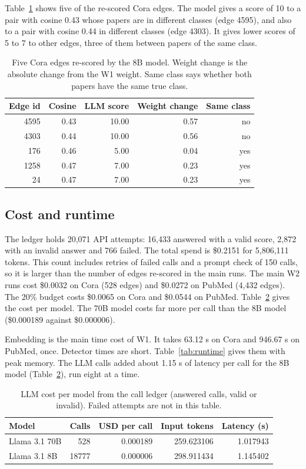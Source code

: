 Table~\ref{tab:case} shows five of the re-scored Cora edges. The model gives a score of 10 to a pair with cosine 0.43 whose papers are in different classes (edge 4595), and also to a pair with cosine 0.44 in different classes (edge 4303). It gives lower scores of 5 to 7 to other edges, three of them between papers of the same class.

\begin{table}[!t]
\centering
\caption{Five Cora edges re-scored by the 8B model. Weight change is the absolute change from the W1 weight. Same class says whether both papers have the same true class.}
\label{tab:case}
\footnotesize
\begin{tabular}{@{}rrrrr@{}}
\toprule
Edge id & Cosine & LLM score & Weight change & Same class \\
\midrule
4595 & 0.43 & 10.00 & 0.57 & no \\
4303 & 0.44 & 10.00 & 0.56 & no \\
176 & 0.46 & 5.00 & 0.04 & yes \\
1258 & 0.47 & 7.00 & 0.23 & yes \\
24 & 0.47 & 7.00 & 0.23 & yes \\
\bottomrule
\end{tabular}
\end{table}


\subsection{Cost and runtime}
The ledger holds 20,071 API attempts: 16,433 answered with a valid score, 2,872 with an invalid answer and 766 failed. The total spend is \$0.2151 for 5,806,111 tokens. This count includes retries of failed calls and a prompt check of 150 calls, so it is larger than the number of edges re-scored in the main runs. The main W2 runs cost \$0.0032 on Cora (528 edges) and \$0.0272 on PubMed (4,432 edges). The 20\% budget costs \$0.0065 on Cora and \$0.0544 on PubMed. Table~\ref{tab:cost} gives the cost per model. The 70B model costs far more per call than the 8B model (\$0.000189 against \$0.000006).

Embedding is the main time cost of W1. It takes 63.12 s on Cora and 946.67 s on PubMed, once. Detector times are short. Table~\ref{tab:runtime} gives them with peak memory. The LLM calls added about 1.15 s of latency per call for the 8B model (Table~\ref{tab:cost}), run eight at a time.

\begin{table}[!t]
\centering
\caption{LLM cost per model from the call ledger (answered calls, valid or invalid). Failed attempts are not in this table.}
\label{tab:cost}
\small
\begin{tabular}{@{}lrrrr@{}}
\toprule
Model & Calls & USD per call & Input tokens & Latency (s) \\
\midrule
Llama 3.1 70B & 528 & 0.000189 & 259.623106 & 1.017943 \\
Llama 3.1 8B & 18777 & 0.000006 & 298.911434 & 1.145402 \\
\bottomrule
\end{tabular}
\end{table}


